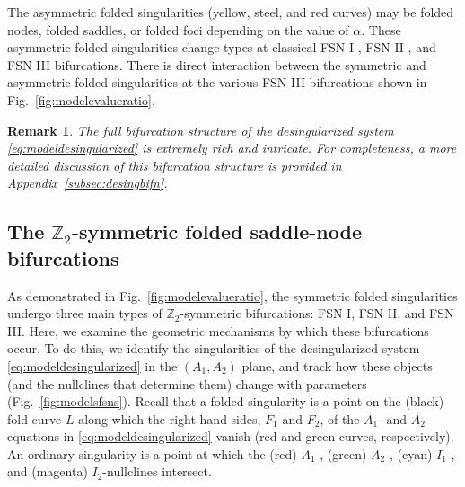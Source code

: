 \documentclass[10pt,onecolumn]{article}
\theoremstyle{plain}
\newtheorem{remark}{Remark}[section]
\begin{document}
The asymmetric folded singularities (yellow, steel, and red curves) may be folded nodes, folded saddles, or folded foci depending on the value of $\alpha$. 
These asymmetric folded singularities change types at classical FSN I \cite{Vo2015}, FSN II \cite{Krupa2010}, and FSN III \cite{Roberts2015,RobertsThesis} bifurcations. 
There is direct interaction between the symmetric and asymmetric folded singularities at the various FSN III bifurcations shown in Fig.~\ref{fig:modelevalueratio}. 

\medskip
\begin{remark}
The full bifurcation structure of the desingularized system \eqref{eq:modeldesingularized} is extremely rich and intricate. 
For completeness, a more detailed discussion of this bifurcation structure is provided in  Appendix~\ref{subsec:desingbifn}. 
\end{remark}

\subsection{The $\mathbb Z_2$-symmetric folded saddle-node bifurcations}  \label{subsec:SFSNs}
As demonstrated in Fig.~\ref{fig:modelevalueratio}, the symmetric folded singularities undergo three main types of $\mathbb Z_2$-symmetric bifurcations: FSN I, FSN II, and FSN III.
Here, we examine the geometric mechanisms by which these bifurcations occur. 
To do this, we identify the singularities of the desingularized system \eqref{eq:modeldesingularized} in the $(A_1,A_2)$ plane, and track how these objects (and the nullclines that determine them) change with parameters (Fig.~\ref{fig:modelsfsns}). 
Recall that a folded singularity is a point on the (black) fold curve $L$ along which the right-hand-sides, $F_1$ and $F_2$, of the $A_1$- and $A_2$-equations in \eqref{eq:modeldesingularized} vanish (red and green curves, respectively). 
An ordinary singularity is a point at which the (red) $A_1$-, (green) $A_2$-, (cyan) $I_1$-, and (magenta) $I_2$-nullclines intersect. 
\end{document}
